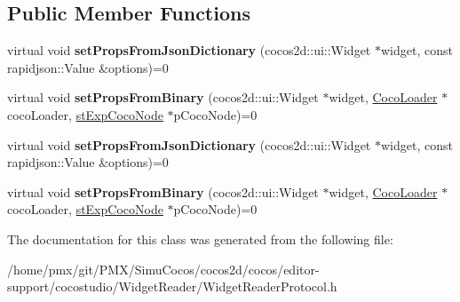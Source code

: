 \subsection*{Public Member Functions}
\begin{DoxyCompactItemize}
\item 
\mbox{\label{classcocostudio_1_1WidgetReaderProtocol_a86ef38e7a6256036b28e69fdf7c94e2a}} 
virtual void {\bfseries set\+Props\+From\+Json\+Dictionary} (cocos2d\+::ui\+::\+Widget $\ast$widget, const rapidjson\+::\+Value \&options)=0
\item 
\mbox{\label{classcocostudio_1_1WidgetReaderProtocol_a958a7b4ddb0bee1b8f192a4389835459}} 
virtual void {\bfseries set\+Props\+From\+Binary} (cocos2d\+::ui\+::\+Widget $\ast$widget, \hyperlink{classcocostudio_1_1CocoLoader}{Coco\+Loader} $\ast$coco\+Loader, \hyperlink{structcocostudio_1_1stExpCocoNode}{st\+Exp\+Coco\+Node} $\ast$p\+Coco\+Node)=0
\item 
\mbox{\label{classcocostudio_1_1WidgetReaderProtocol_a86ef38e7a6256036b28e69fdf7c94e2a}} 
virtual void {\bfseries set\+Props\+From\+Json\+Dictionary} (cocos2d\+::ui\+::\+Widget $\ast$widget, const rapidjson\+::\+Value \&options)=0
\item 
\mbox{\label{classcocostudio_1_1WidgetReaderProtocol_a958a7b4ddb0bee1b8f192a4389835459}} 
virtual void {\bfseries set\+Props\+From\+Binary} (cocos2d\+::ui\+::\+Widget $\ast$widget, \hyperlink{classcocostudio_1_1CocoLoader}{Coco\+Loader} $\ast$coco\+Loader, \hyperlink{structcocostudio_1_1stExpCocoNode}{st\+Exp\+Coco\+Node} $\ast$p\+Coco\+Node)=0
\end{DoxyCompactItemize}


The documentation for this class was generated from the following file\+:\begin{DoxyCompactItemize}
\item 
/home/pmx/git/\+P\+M\+X/\+Simu\+Cocos/cocos2d/cocos/editor-\/support/cocostudio/\+Widget\+Reader/Widget\+Reader\+Protocol.\+h\end{DoxyCompactItemize}
